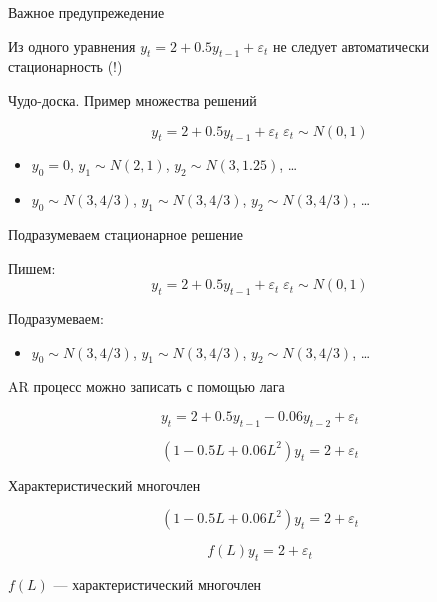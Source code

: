 \documentclass[ignorenonframetext,]{beamer}
\begin{document}
\begin{frame}{Важное предупрежедение}

Из одного уравнения $y_t = 2 + 0.5 y_{t-1} + \varepsilon_t $ не следует
автоматически стационарность (!)

\end{frame}

\begin{frame}{Чудо-доска. Пример множества решений}

\[
y_t = 2 + 0.5 y_{t-1} + \varepsilon_t \; \varepsilon_t \sim N(0,1)
\]

\begin{itemize}
\item
  $y_0=0$, $y_1\sim N(2,1)$, $y_2\sim N(3, 1.25)$, \ldots
\item
  $y_0\sim N(3, 4/3)$, $y_1\sim N(3, 4/3)$, $y_2\sim N(3, 4/3)$, \ldots
\end{itemize}

\end{frame}

\begin{frame}{Подразумеваем стационарное решение}

Пишем: \[
y_t = 2 + 0.5 y_{t-1} + \varepsilon_t \; \varepsilon_t \sim N(0,1)
\]

Подразумеваем:

\begin{itemize}
\itemsep1pt\parskip0pt
\item
  $y_0\sim N(3, 4/3)$, $y_1\sim N(3, 4/3)$, $y_2\sim N(3, 4/3)$, \ldots
\end{itemize}

\end{frame}

\begin{frame}{AR процесс можно записать с помощью лага}

\[
y_t=2+0.5y_{t-1}-0.06y_{t-2}+\varepsilon_t
\]

\[
(1-0.5L+0.06L^2)y_t=2+\varepsilon_t
\]

\end{frame}

\begin{frame}{Характеристический многочлен}

\[
(1-0.5L+0.06L^2)y_t=2+\varepsilon_t
\]

\[
f(L)y_t=2+\varepsilon_t
\]

$f(L)$ --- характеристический многочлен

\end{frame}
\end{document}
